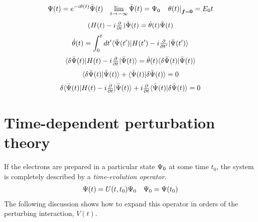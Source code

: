 \documentclass[11pt]{article}
\numberwithin{equation}{section}
\begin{document}
\begin{dfn}
\begin{align}
  \Y(t)
=
  e^{-i\th(t)}
  \bar{\Y}(t)
&&
  \lim_{t\rightarrow-\infty}
  \bar{\Y}(t)
=
  \Y_0
&&
  \left.
  \th(t)
  \right|_{\bm{f}=\bo{0}}
=
  E_0
  t
\end{align}
\begin{align}
  (
    H(t)
  -
    i
    \tfrac{\partial}{\partial t}
  )
  \bar{\Psi }(t)
=
  \dot{\theta }(t)
  \bar{\Psi }(t)
\end{align}
\begin{align}
  \dot{\theta }(t)
=
  \int_0^t
  dt'
  \langle\bar{\Psi }(t')|
    H(t')
  -
    i\tfrac{\partial}{\partial t'}
  |\bar{\Psi }(t')\rangle
\end{align}
\begin{align}
  \langle\delta \bar{\Psi }(t)|
    H(t)
  -
    i
    \tfrac{\partial}{\partial t}
  |\bar{\Psi }(t)\rangle
=
  \dot{\theta }(t)
  \langle\delta \bar{\Psi }(t)|\bar{\Psi }(t)\rangle
\end{align}
\begin{align}
  \langle\delta \bar{\Psi }(t)|\bar{\Psi }(t)\rangle
+
  \langle\bar{\Psi }(t)|\delta \bar{\Psi }(t)\rangle
=
  0
\end{align}
\begin{align}
  \delta 
  \langle\bar{\Psi }(t)|
    H(t)
  -
    i
    \tfrac{\partial}{\partial t}
  |\bar{\Psi }(t)\rangle
+
  i
  \tfrac{\partial}{\partial t}
  \langle\bar{\Psi }(t)|\delta \bar{\Psi }(t)\rangle
=
  0
\end{align}
\end{dfn}


\newpage
\appendix

\section{Time-dependent perturbation theory}
\label{appendix:tdpt}

\begin{rmk}
If the electrons are prepared in a particular state $\Psi _0$ at some time $t_0$, the system is completely described by a \textit{time-evolution operator}.
\begin{align}
  \Psi (t)=U(t,t_0)\Psi _0
&&
  \Psi _0
=
  \Psi (t_0)
\end{align}
The following discussion shows how to expand this operator in orders of the perturbing interaction, $V(t)$.
\end{rmk}
\end{document}
